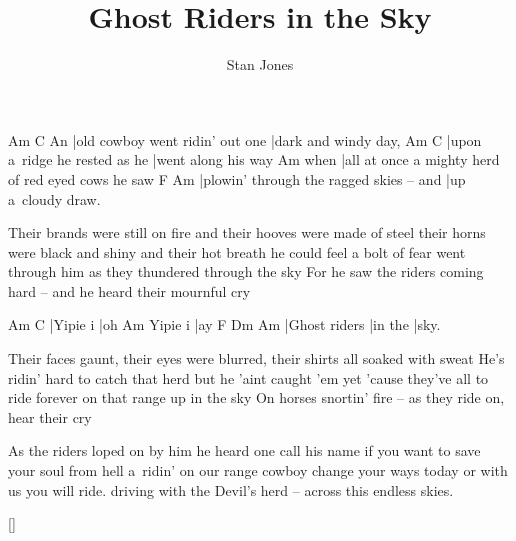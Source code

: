 \documentclass{song}
\title{Ghost Riders in the Sky}
\author{Stan Jones}
\begin{document}
\strophe
   Am                              C
An |old cowboy went ridin' out one |dark and windy day,
Am                            C
|upon a~ridge he rested as he |went along his way
     Am
when |all at once a mighty herd of red eyed cows he saw
F                                     Am
|plowin' through the ragged skies -- and |up a~cloudy draw.
\endstrophe

\strophe*
Their brands were still on fire and their hooves were made of steel
their horns were black and shiny and their hot breath he could feel
a bolt of fear went through him as they thundered through the sky
For he saw the riders coming hard -- and he heard their mournful cry
\endstrophe

Am       C
|Yipie i |oh
        Am
Yipie i |ay
F             Dm      Am
|Ghost riders |in the |sky.
\endstrophe


\strophe*
Their faces gaunt, their eyes were blurred, their shirts all soaked with sweat
He's ridin' hard to catch that herd but he 'aint caught 'em yet
'cause they've all to ride forever on that range up in the sky
On horses snortin' fire -- as they ride on, hear their cry
\endstrophe

\strophe*
As the riders loped on by him he heard one call his name
if you want to save your soul from hell a~ridin' on our range
cowboy change your ways today or with us you will ride.
driving with the Devil's herd -- across this endless skies.
\endstrophe

\ref{}
\end{document}
